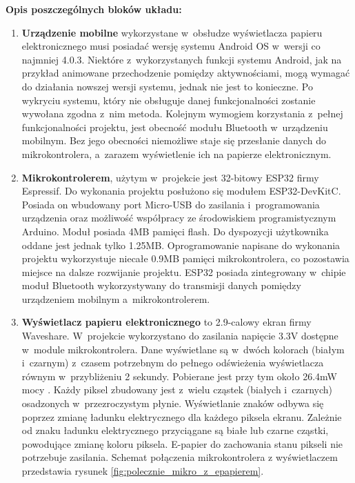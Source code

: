 \documentclass[a4paper,12pt, twoside]{article}
\begin{document}
        \begin{flushleft}
        \textbf{Opis poszczególnych bloków układu:}
        \end{flushleft}
        \begin{enumerate}
            \item \textbf{Urządzenie mobilne} wykorzystane w~obsłudze wyświetlacza papieru elektronicznego musi posiadać wersję systemu Android OS w~wersji co najmniej 4.0.3. Niektóre z~wykorzystanych funkcji systemu Android, jak na przykład animowane przechodzenie pomiędzy aktywnościami, mogą wymagać do działania nowszej wersji systemu, jednak nie jest to konieczne. Po wykryciu systemu, który nie obsługuje danej funkcjonalności zostanie wywołana zgodna z~nim metoda.
            Kolejnym wymogiem korzystania z~pełnej funkcjonalności projektu, jest obecność modułu Bluetooth w~urządzeniu mobilnym. Bez jego obecności niemożliwe staje się przesłanie danych do mikrokontrolera, a~zarazem wyświetlenie ich na papierze elektronicznym.
        
    	    \item \textbf{Mikrokontrolerem}, użytym w~projekcie jest 32-bitowy ESP32 firmy Espressif. Do wykonania projektu posłużono się modułem ESP32-DevKitC. Posiada on wbudowany port Micro-USB do zasilania i~programowania urządzenia oraz możliwość współpracy ze środowiskiem programistycznym Arduino. Moduł posiada 4MB pamięci flash\cite{flash}. Do dyspozycji użytkownika oddane jest jednak tylko 1.25MB. Oprogramowanie napisane do wykonania projektu wykorzystuje niecałe 0.9MB pamięci mikrokontrolera, co pozostawia miejsce na dalsze rozwijanie projektu. ESP32 posiada zintegrowany w~chipie moduł Bluetooth wykorzystywany do transmisji danych pomiędzy urządzeniem mobilnym a~mikrokontrolerem.
    
    
            \item \textbf{Wyświetlacz papieru elektronicznego} to 2.9-calowy ekran firmy Waveshare. W~projekcie wykorzystano do zasilania napięcie 3.3V dostępne w~module mikrokontrolera. Dane wyświetlane są w~dwóch kolorach (białym i~czarnym) z~czasem potrzebnym do pełnego odświeżenia wyświetlacza równym w~przybliżeniu 2 sekundy. Pobierane jest przy tym około 26.4mW mocy \cite{waveshare}. Każdy piksel zbudowany jest z~wielu cząstek (białych i~czarnych) osadzonych w~przezroczystym płynie. Wyświetlanie znaków odbywa się poprzez zmianę ładunku elektrycznego dla każdego piksela ekranu. Zależnie od znaku ładunku elektrycznego przyciągane są białe lub czarne cząstki, powodujące zmianę koloru piksela. E-papier do zachowania stanu pikseli nie potrzebuje zasilania. Schemat połączenia mikrokontrolera z wyświetlaczem przedstawia rysunek \ref{fig:polecznie_mikro_z_epapierem}.
            


\end{enumerate}
\end{document}
